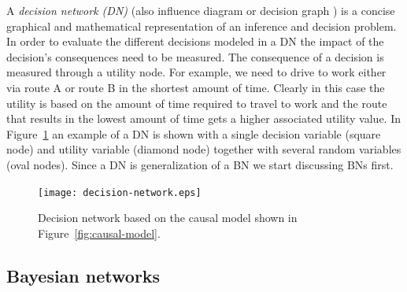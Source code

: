 \documentclass[conference]{IEEEtran}
\begin{document}
A {\em decision network (DN)} (also influence diagram or decision graph \cite{russell02bn,howard84rpada,jensen07book}) is a concise graphical and mathematical representation of an inference and decision problem. In order to evaluate the different decisions modeled in a DN the impact of the decision's consequences need to be measured. The consequence of a decision is measured through a utility node. For example, we need to drive to work either via route A or route B in the shortest amount of time. Clearly in this case the utility is based on the amount of time required to travel to work and the route that results in the lowest amount of time gets a higher associated utility value. In Figure~\ref{fig:decision-graph} an example of a DN is shown with a single decision variable (square node) and utility variable (diamond node) together with several random variables (oval nodes). Since a DN is generalization of a BN we start discussing BNs first.

 
\begin{figure}
\begin{center}
 \texttt{[image: decision-network.eps]}
 \caption{Decision network based on the causal model shown in Figure~\ref{fig:causal-model}.\label{fig:decision-graph}}
\end{center}
\end{figure}


\subsection{Bayesian networks}\label{sec:bayesian-networks}
\end{document}
